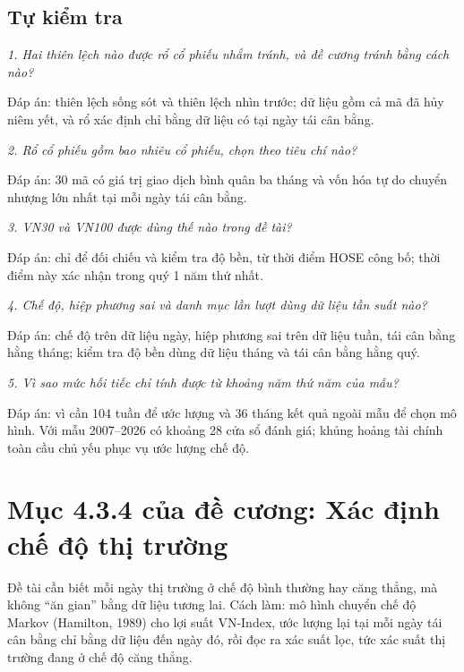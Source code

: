 \section{Tự kiểm tra}

{\itshape 1. Hai thiên lệch nào được rổ cổ phiếu nhắm tránh, và đề cương tránh bằng cách nào?\par}

Đáp án: thiên lệch sống sót và thiên lệch nhìn trước; dữ liệu gồm cả mã đã hủy niêm yết, và rổ xác định chỉ bằng dữ liệu có tại ngày tái cân bằng.

{\itshape 2. Rổ cổ phiếu gồm bao nhiêu cổ phiếu, chọn theo tiêu chí nào?\par}

Đáp án: 30 mã có giá trị giao dịch bình quân ba tháng và vốn hóa tự do chuyển nhượng lớn nhất tại mỗi ngày tái cân bằng.

{\itshape 3. VN30 và VN100 được dùng thế nào trong đề tài?\par}

Đáp án: chỉ để đối chiếu và kiểm tra độ bền, từ thời điểm HOSE công bố; thời điểm này xác nhận trong quý 1 năm thứ nhất.

{\itshape 4. Chế độ, hiệp phương sai và danh mục lần lượt dùng dữ liệu tần suất nào?\par}

Đáp án: chế độ trên dữ liệu ngày, hiệp phương sai trên dữ liệu tuần, tái cân bằng hằng tháng; kiểm tra độ bền dùng dữ liệu tháng và tái cân bằng hằng quý.

{\itshape 5. Vì sao mức hối tiếc chỉ tính được từ khoảng năm thứ năm của mẫu?\par}

Đáp án: vì cần 104 tuần để ước lượng và 36 tháng kết quả ngoài mẫu để chọn mô hình. Với mẫu 2007--2026 có khoảng 28 cửa sổ đánh giá; khủng hoảng tài chính toàn cầu chủ yếu phục vụ ước lượng chế độ.

\chapter{Mục 4.3.4 của đề cương: Xác định chế độ thị trường}

Đề tài cần biết mỗi ngày thị trường ở chế độ bình thường hay căng thẳng, mà không “ăn gian” bằng dữ liệu tương lai. Cách làm: mô hình chuyển chế độ Markov (Hamilton, 1989) cho lợi suất VN-Index, ước lượng lại tại mỗi ngày tái cân bằng chỉ bằng dữ liệu đến ngày đó, rồi đọc ra xác suất lọc, tức xác suất thị trường đang ở chế độ căng thẳng.

